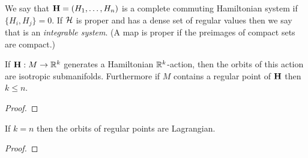 \begin{dfn}
    We say that $\mathbf{H}=(H_1,\ldots,H_n)$ is a complete commuting Hamiltonian system if $\{H_i,H_j\}=0$.
    If $\mathcal{H}$ is proper and has a dense set of regular values then we say that is an \emph{integrable system}.
    (A map is proper if the preimages of compact sets are compact.)
\end{dfn}

\begin{lem}
    If $\mathbf{H}:M\to\mathbb{R}^k$ generates a Hamiltonian $\mathbb{R}^k$-action, then the orbits of this action are isotropic submanifolds.
    Furthermore if $M$ contains a regular point of $\mathbf{H}$ then $k\le n$.
\end{lem}

\begin{proof}
\end{proof}

\begin{cor}
    If $k=n$ then the orbits of regular points are Lagrangian.
\end{cor}

\begin{proof}
\end{proof}